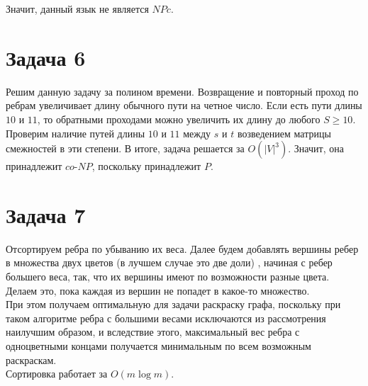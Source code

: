 \documentclass[a4paper,12pt]{article} %
\begin{document}
 Значит, данный язык не является $NPc$.
 
 \section*{Задача 6}
Решим данную задачу за полином времени. Возвращение и повторный проход по ребрам увеличивает длину обычного пути на четное число. Если есть пути длины $10$ и $11$, то обратными проходами можно увеличить их длину до любого $S\geq 10$. Проверим наличие путей длины $10$ и $11$ между $s$ и $t$ возведением матрицы смежностей в эти степени. В итоге, задача решается за $O(|V|^3)$. Значит, она принадлежит $co$-$NP$, поскольку принадлежит $P$.\\

\section*{Задача 7} 

Отсортируем ребра по убыванию их веса. Далее будем добавлять вершины ребер в множества двух цветов (в лучшем случае это две доли) , начиная   
 с ребер большего веса, так, что их вершины имеют по возможности разные цвета. Делаем это, пока каждая из вершин не попадет в какое-то множество.\\
  При этом получаем оптимальную для задачи раскраску графа, поскольку при таком алгоритме ребра с большими весами исключаются из рассмотрения наилучшим образом, и вследствие этого, максимальный вес ребра с одноцветными концами получается минимальным по всем возможным раскраскам.\\   
 Сортировка работает за $O(m\log{m})$.
\end{document}
